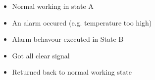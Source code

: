 \documentclass{beamer}
\begin{document}
\begin{frame}
\begin{columns}[c]
  \begin{column}{1in}
    \begin{center}
    \end{center}
  \end{column}
  \begin{column}{3in}
    \setcounter{beamerpauses}{1}
    \begin{itemize}
      \item<+-|alert@+> Normal working in state A
      \item<+-|alert@+> An alarm occured (e.g. temperature too high)
      \item<+-|alert@+> Alarm behavour executed in State B
      \item<+-|alert@+> Got all clear signal 
      \item<+-> Returned back to normal working state 
    \end{itemize}
  \end{column}
\end{columns}
\end{frame}
\end{document}
